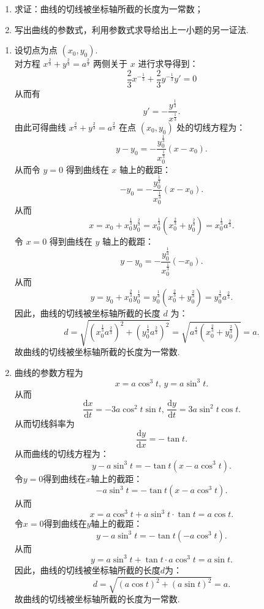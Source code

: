 \begin{enumerate}
    \begin{enumerate}
        \item[(a)]求证：曲线的切线被坐标轴所截的长度为一常数；
        \item[(b)]写出曲线的参数式，利用参数式求导给出上一小题的另一证法.
    \end{enumerate}
    \begin{solution}
        \begin{enumerate}
        \item[(a)]
        设切点为点 $(x_{0},y_{0})$.\\
        对方程 $x^{\frac{2}{3}}+y^{\frac{2}{3}}=a^{\frac{2}{3}}$ 两侧关于 $x$ 进行求导得到：
        \[
        \displaystyle \frac{2}{3}x^{-\frac{1}{3}}+\frac{2}{3}y^{-\frac{1}{3}}y'=0
        \]
        从而有
        \[
        y'=-\frac{y^{\frac{1}{3}}}{x^{\frac{1}{3}}}.
        \]
        由此可得曲线 $x^{\frac{2}{3}}+y^{\frac{2}{3}}=a^{\frac{2}{3}}$ 在点 $(x_0,y_0)$ 处的切线方程为：
        \[
        y-y_0=-\frac{y_0^{\frac{1}{3}}}{x_0^{\frac{1}{3}}}(x-x_0).
        \]
        从而令 $y=0$ 得到曲线在 $x$ 轴上的截距：
        \[
        -y_0=-\frac{y_0^{\frac{1}{3}}}{x_0^{\frac{1}{3}}}(x-x_0).
        \]
        从而
        \[
        x=x_{0}+x_0^{\frac{1}{3}}y_0^{\frac{2}{3}}=x_0^{\frac{1}{3}}(x_0^{\frac{2}{3}}+y_0^{\frac{2}{3}})=x_0^{\frac{1}{3}}a^{\frac{2}{3}}.
        \]
        令 $x=0$ 得到曲线在 $y$ 轴上的截距：
        \[
        y-y_0=-\frac{y_0^{\frac{1}{3}}}{x_0^{\frac{1}{3}}}(-x_0).
        \]
        从而
        \[
        y=y_0+x_0^{\frac{2}{3}}y_0^{\frac{1}{3}}=y_0^{\frac{1}{3}}(x_0^{\frac{2}{3}}+y_0^{\frac{2}{3}})=y_0^{\frac{1}{3}}a^{\frac{2}{3}}.
        \]
        因此，曲线的切线被坐标轴所截的长度 $d$ 为：
        \[
        d=\sqrt{(x_0^{\frac{1}{3}}a^{\frac{2}{3}})^2+(y_0^{\frac{1}{3}}a^{\frac{2}{3}})^2}=\sqrt{a^{\frac{4}{3}}(x_0^{\frac{2}{3}}+y_0^{\frac{2}{3}})}=a.
        \]
        故曲线的切线被坐标轴所截的长度为一常数. 

        \item[(b)]
        曲线的参数方程为
        \[
        x=a\cos^3 t,\, y=a\sin^3 t.
        \]
        从而
        \[
        \frac{\mathrm{d}x}{\mathrm{d}t}=-3a\cos^2 t\sin t,\,
        \frac{\mathrm{d}y}{\mathrm{d}t}=3a\sin^2 t\cos t.
        \]
        从而切线斜率为
        \[
        \frac{\mathrm{d}y}{\mathrm{d}x}=-\tan t.
        \]
        从而曲线的切线方程为：
        \[
        y-a\sin^3 t=-\tan t (x-a\cos^3 t).
        \]
        令$y=0$得到曲线在$x$轴上的截距：
        \[
        -a\sin^3 t=-\tan t(x-a\cos^3 t).
        \]
        从而
        \[
        x=a\cos^3 t+a\sin^3 t\cdot \tan t=a\cos t.
        \]
        令$x=0$得到曲线在$y$轴上的截距：
        \[
        y-a\sin^3 t=-\tan t(-a\cos^3 t).
        \]
        从而
        \[
        y=a\sin^3 t+\tan t\cdot a\cos^3 t=a\sin t.
        \]
        因此，曲线的切线被坐标轴所截的长度$d$为：
        \[
        d=\sqrt{(a\cos t)^2+(a\sin t)^2}=a.
        \]
        故曲线的切线被坐标轴所截的长度为一常数.
        \end{enumerate}
    \end{solution}


\end{enumerate}
